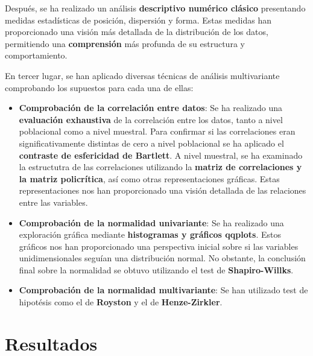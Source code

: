 \documentclass[a4paper, 11pt]{article}
\begin{document}
Después, se ha realizado un análisis \textbf{descriptivo numérico clásico} presentando medidas estadísticas de posición, dispersión y forma. Estas medidas han proporcionado una visión más detallada de la distribución de los datos, permitiendo una \textbf{comprensión} más profunda de su estructura y comportamiento.

En tercer lugar, se han aplicado diversas técnicas de análisis multivariante comprobando los supuestos para cada una de ellas:

\begin{itemize}
\item \textbf{Comprobación de la correlación entre datos}: Se ha realizado una \textbf{evaluación exhaustiva} de la correlación entre los datos, tanto a nivel poblacional como a nivel muestral. Para confirmar si las correlaciones eran significativamente distintas de cero a nivel poblacional se ha aplicado el \textbf{contraste de esfericidad de Bartlett}. A nivel muestral, se ha examinado la estructutra de las correlaciones utilizando la \textbf{matriz de correlaciones y la matriz policrítica}, así como otras representaciones gráficas. Estas representaciones nos han proporcionado una visión detallada de las relaciones entre las variables.

\item \textbf{Comprobación de la normalidad univariante}: Se ha realizado una exploración gráfica mediante \textbf{histogramas y gráficos qqplots}. Estos gráficos nos han proporcionado una perspectiva inicial sobre si las variables unidimensionales seguían una distribución normal. No obstante, la conclusión final sobre la normalidad se obtuvo utilizando el test de \textbf{Shapiro-Willks}.


\item \textbf{Comprobación de la normalidad multivariante}: Se han utilizado test de hipotésis como el de \textbf{Royston} y el de \textbf{Henze-Zirkler}.
\end{itemize}

\newpage

\section{Resultados}
\end{document}
